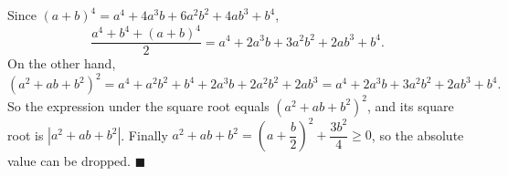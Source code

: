 Since $(a+b)^4=a^4+4a^3b+6a^2b^2+4ab^3+b^4$,
\[\dfrac{a^4+b^4+(a+b)^4}{2}=a^4+2a^3b+3a^2b^2+2ab^3+b^4.\]
On the other hand,
\[\left(a^2+ab+b^2\right)^2=a^4+a^2b^2+b^4+2a^3b+2a^2b^2+2ab^3=a^4+2a^3b+3a^2b^2+2ab^3+b^4.\]
So the expression under the square root equals $\left(a^2+ab+b^2\right)^2$, and its square root is $\left|a^2+ab+b^2\right|$. Finally $a^2+ab+b^2=\left(a+\dfrac b2\right)^2+\dfrac{3b^2}{4}\ge0$, so the absolute value can be dropped. $\blacksquare$
